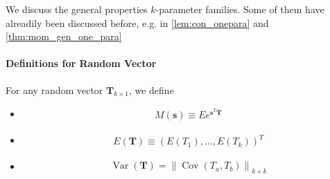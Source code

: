 \documentclass{article}
\begin{document}
We discuss the general properties $k$-parameter families. Some of them have alreadily been discussed before, e.g. in \cref{lem:con_onepara} and \cref{thm:mom_gen_one_para}

\paragraph{Definitions for Random Vector}
For any random vector $\mathbf{T}_{k \times 1}$, we define
\begin{itemize}
    \item {}
    \begin{align*}
M(\mathbf{s}) \equiv E e^{\mathbf{s}^{T} \mathbf{T}}
\end{align*}
\item {}
\begin{align*}
E(\mathbf{T}) \equiv\left(E\left(T_{1}\right), \ldots, E\left(T_{k}\right)\right)^{T}
\end{align*}
\item {}
\begin{align*}
\operatorname{Var}(\mathbf{T})=\left\|\operatorname{Cov}\left(T_{a}, T_{b}\right)\right\|_{k \times k}
\end{align*}
\end{itemize}
\end{document}
